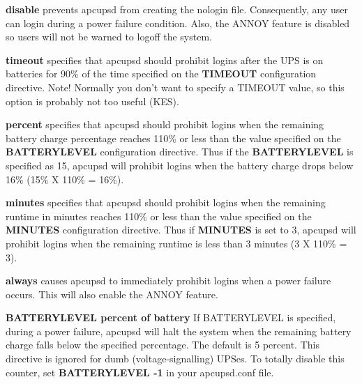 \begin{description}
\begin{description}

\item {\bf disable}
prevents apcupsd from creating the nologin file.  Consequently, any user can
login during a power failure condition.  Also, the ANNOY feature is disabled
so users will not be warned to logoff the system.  

\item {\bf timeout}
specifies that apcupsd should prohibit logins after the UPS is on batteries
for 90\% of the time specified on the {\bf TIMEOUT} configuration directive.
Note! Normally you don't want to specify a TIMEOUT value, so this option is
probably not too useful (KES).  

\item {\bf percent}
specifies that apcupsd should prohibit logins when the remaining battery
charge percentage reaches 110\% or less than the value specified on the {\bf
BATTERYLEVEL} configuration directive. Thus if the {\bf BATTERYLEVEL} is
specified as 15, apcupsd will prohibit logins when the battery charge drops
below 16\% (15\% X 110\% = 16\%).  

\item {\bf minutes}
specifies that apcupsd should prohibit logins when the remaining runtime in
minutes reaches 110\% or less than the value specified on the {\bf MINUTES}
configuration directive.  Thus if {\bf MINUTES} is set to 3, apcupsd will
prohibit logins when the remaining runtime is less than 3 minutes (3 X 110\% =
3).  

\item {\bf always}
causes apcupsd to immediately prohibit logins when a power failure occurs.
This will also enable the ANNOY feature. 
\end{description}


\item {\bf BATTERYLEVEL \lt{}percent of battery\gt{}}
If BATTERYLEVEL is specified, during a power failure, apcupsd will halt the
system when the remaining battery charge falls below the specified percentage.
The default is 5 percent. This directive is ignored for dumb
(voltage-signalling) UPSes. To totally disable this counter, set {\bf
BATTERYLEVEL -1} in your apcupsd.conf file.  


\end{description}
